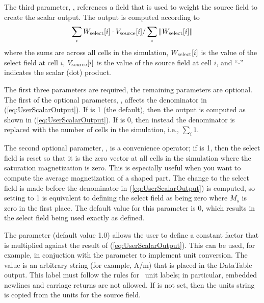 The third parameter, , references a field that
is used to weight the source field to create the scalar output.  The
output is computed according to
\begin{equation}
\sum_i W_{\rm select}[i]\cdot V_{\rm source}[i]
/\sum_i \|W_{\rm select}[i]\|
\label{eq:UserScalarOutput}
\end{equation}
where the sums are across all cells in the simulation, $W_{\rm
select}[i]$ is the value of the select field at cell $i$,
$V_{\rm source}[i]$ is the value of the source field at cell $i$,
and ``$\cdot$'' indicates the scalar (dot) product.

The first three parameters are required, the remaining parameters are
optional.  The first of the optional parameters, ,
affects the denominator in (\ref{eq:UserScalarOutput}).  If
 is 1 (the default), then the output is computed
as shown in (\ref{eq:UserScalarOutput}).  If  is 0,
then instead the denominator is replaced with the number of cells in the
simulation, i.e., $\sum_i 1$.

The second optional parameter, , is a
convenience operator; if  is 1, then the select field
is reset so that it is the zero vector at all cells in the simulation
where the saturation magnetization is zero.  This is especially useful
when you want to compute the average magnetization of a shaped part.
The change to the select field is made before the denominator in
(\ref{eq:UserScalarOutput}) is computed, so setting
 to 1 is equivalent to defining the select
field as being zero where $M_s$ is zero in the first place.  The default
value for this parameter is 0, which results in the select field being
used exactly as defined.

The  parameter (default value 1.0) allows the
user to define a constant factor that is multiplied against the result
of (\ref{eq:UserScalarOutput}).  This can be used, for example, in
conjuction with the  parameter to implement unit
conversion.  The  value is an arbitrary string (for
example, A/m) that is placed in the DataTable output.  This label must
follow the rules for \ODT\ unit labels; in particular, embedded newlines
and carriage returns are not allowed.  If  is not set,
then the units string is copied from the units for the source field.

